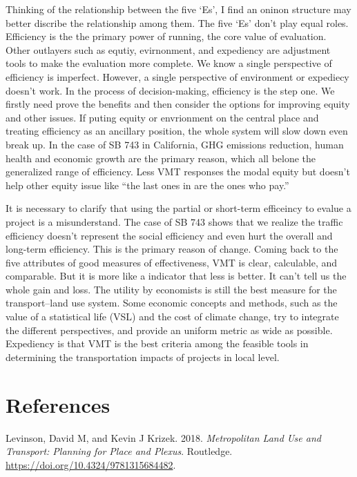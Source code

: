 \documentclass[12pt,]{article}
\begin{document}
Thinking of the relationship between the five `Es', I find an oninon
structure may better discribe the relationship among them. The five `Es'
don't play equal roles. Efficiency is the the primary power of running,
the core value of evaluation. Other outlayers such as equtiy,
evirnonment, and expediency are adjustment tools to make the evaluation
more complete. We know a single perspective of efficiency is imperfect.
However, a single perspective of environment or expediecy doesn't work.
In the process of decision-making, efficiency is the step one. We
firstly need prove the benefits and then consider the options for
improving equity and other issues. If puting equity or envrionment on
the central place and treating efficiency as an ancillary position, the
whole system will slow down even break up. In the case of SB 743 in
California, GHG emissions reduction, human health and economic growth
are the primary reason, which all belone the generalized range of
efficiency. Less VMT responses the modal equity but doesn't help other
equity issue like ``the last ones in are the ones who pay.''

It is necessary to clarify that using the partial or short-term
efficeincy to evalue a project is a misunderstand. The case of SB 743
shows that we realize the traffic efficiency doesn't represent the
social efficiency and even hurt the overall and long-term efficiency.
This is the primary reason of change. Coming back to the five attributes
of good measures of effectiveness, VMT is clear, calculable, and
comparable. But it is more like a indicator that less is better. It
can't tell us the whole gain and loss. The utility by economists is
still the best measure for the transport--land use system. Some economic
concepts and methods, such as the value of a statistical life (VSL) and
the cost of climate change, try to integrate the different perspectives,
and provide an uniform metric as wide as possible. Expediency is that
VMT is the best criteria among the feasible tools in determining the
transportation impacts of projects in local level.

\hypertarget{references}{%
\section*{References}\label{references}}

\hypertarget{refs}{}
\leavevmode\hypertarget{ref-levinson2018metropolitan}{}%
Levinson, David M, and Kevin J Krizek. 2018. \emph{Metropolitan Land Use
and Transport: Planning for Place and Plexus}. Routledge.
\url{https://doi.org/10.4324/9781315684482}.
\end{document}
